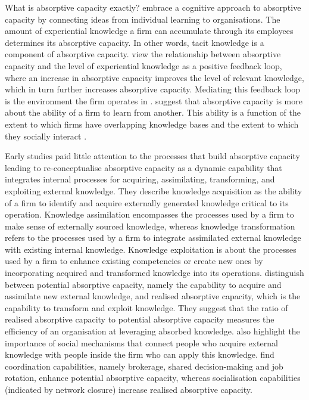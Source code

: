 What is absorptive capacity exactly? \citet{cohen1990absorptive} embrace a cognitive approach to absorptive capacity by connecting ideas from individual learning to organisations. The amount of experiential knowledge a firm can accumulate through its employees determines its absorptive capacity. In other words, tacit knowledge is a component of absorptive capacity. \citet{cohen1990absorptive} view the relationship between absorptive capacity and the level of experiential knowledge as a positive feedback loop, where an increase in absorptive capacity improves the level of relevant knowledge, which in turn further increases absorptive capacity. Mediating this feedback loop is the environment the firm operates in \citep{van1999coevolution}. \citet{lane1998relative} suggest that absorptive capacity is more about the ability of a firm to learn from another. This ability is a function of the extent to which firms have overlapping knowledge bases and the extent to which they socially interact \citep{dyer1998relational,nooteboom2000learning}. \medskip

Early studies paid little attention to the processes that build absorptive capacity leading \citet{zahra2002absorptive} to re-conceptualise absorptive capacity as a dynamic capability that integrates internal processes for acquiring, assimilating, transforming, and exploiting external knowledge. They describe knowledge acquisition as the ability of a firm to identify and acquire externally generated knowledge critical to its operation. Knowledge assimilation encompasses the processes used by a firm to make sense of externally sourced knowledge, whereas knowledge transformation refers to the processes used by a firm to integrate assimilated external knowledge with existing internal knowledge. Knowledge exploitation is about the processes used by a firm to enhance existing competencies or create new ones by incorporating acquired and transformed knowledge into its operations. \citet{zahra2002absorptive} distinguish between potential absorptive capacity, namely the capability to acquire and assimilate new external knowledge, and realised absorptive capacity, which is the capability to transform and exploit knowledge. They suggest that the ratio of realised absorptive capacity to potential absorptive capacity measures the efficiency of an organisation at leveraging absorbed knowledge. \citet{zahra2002absorptive} also highlight the importance of social mechanisms that connect people who acquire external knowledge with people inside the firm who can apply this knowledge. \citet{jansen2005managing} find coordination capabilities, namely brokerage, shared decision-making and job rotation, enhance potential absorptive capacity, whereas socialisation capabilities (indicated by network closure) increase realised absorptive capacity. \medskip

